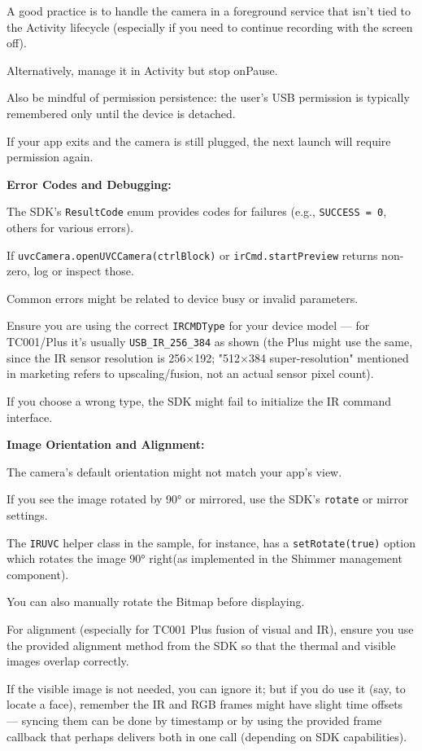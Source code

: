 {A good practice is to handle the camera in a foreground service that isn't tied
to the Activity lifecycle (especially if you need to continue recording with the
screen off).

Alternatively, manage it in Activity but stop onPause.

Also be mindful of permission persistence: the user's USB permission is
typically remembered only until the device is detached.

If your app exits and the camera is still plugged, the next launch will require
permission again.

\item \textbf{Error Codes and Debugging:}

The SDK's \texttt{ResultCode} enum provides codes for failures (e.g.,
\texttt{SUCCESS = 0}, others for various errors).

If \texttt{uvcCamera.openUVCCamera(ctrlBlock)} or \texttt{irCmd.startPreview}
returns non-zero, log or inspect those.

Common errors might be related to device busy or invalid parameters.

Ensure you are using the correct \texttt{IRCMDType} for your device model ---
for TC001/Plus it's usually \texttt{USB_IR_256_384} as shown (the Plus might use
the same, since the IR sensor resolution is 256×192; "512×384 super-resolution"
mentioned in marketing refers to upscaling/fusion, not an actual sensor pixel
count).

If you choose a wrong type, the SDK might fail to initialize the IR command
interface.

\item \textbf{Image Orientation and Alignment:}

The camera's default orientation might not match your app's view.

If you see the image rotated by 90° or mirrored, use the SDK's \texttt{rotate}
or mirror settings.

The \texttt{IRUVC} helper class in the sample, for instance, has a
\texttt{setRotate(true)} option which rotates the image 90° right(as implemented
in the Shimmer management component).

You can also manually rotate the Bitmap before displaying.

For alignment (especially for TC001 Plus fusion of visual and IR), ensure you
use the provided alignment method from the SDK so that the thermal and visible
images overlap correctly.

If the visible image is not needed, you can ignore it; but if you do use it
(say, to locate a face), remember the IR and RGB frames might have slight time
offsets --- syncing them can be done by timestamp or by using the provided frame
callback that perhaps delivers both in one call (depending on SDK capabilities).

}
